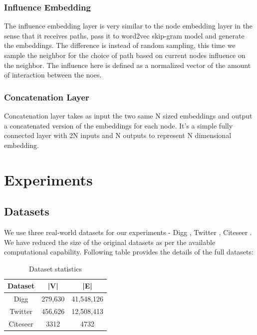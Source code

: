 \subsubsection{Influence Embedding}

The influence embedding layer is very similar to the node embedding layer in the sense that it receives paths, pass it to word2vec skip-gram model and generate the embeddings. The difference is instead of random sampling, this time we sample the neighbor for the choice of path based on current nodes influence on the neighbor. The influence here is defined as a normalized vector of the amount of interaction between the noes.

\subsubsection{Concatenation Layer}

Concatenation layer takes as input the two same N sized embeddings and output a concatenated version of the embeddings for each node. It's a simple fully connected layer with 2N inputs and N outputs to represent N dimensional embedding.

\section{Experiments}

\subsection{Datasets}

We use three real-world datasets for our experiments - Digg \cite{hogg2012social}, Twitter \cite{de2013anatomy}, Citeseer \cite{chung1997spectral}. We have reduced the size of the original datasets as per the available computational capability. Following table provides the details of the full datasets:

\begin{table}
  \caption{Dataset statistics}
  \begin{tabular}{ccc}
    \toprule
    Dataset&|V|&|E|\\
    \midrule
    Digg & 279,630 & 41,548,126 \\
    Twitter & 456,626 & 12,508,413 \\
    Citeseer & 3312 & 4732 \\
  \bottomrule
\end{tabular}
\end{table}

